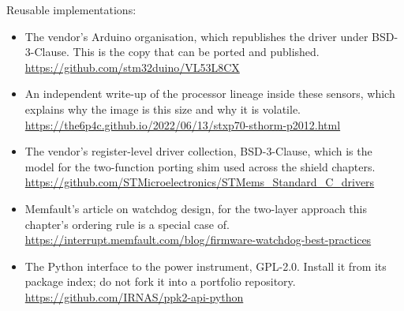 Reusable implementations:
\begin{itemize}
\item The vendor's Arduino organisation, which republishes the driver under
BSD-3-Clause. This is the copy that can be ported and published.\newline
\url{https://github.com/stm32duino/VL53L8CX}
\item An independent write-up of the processor lineage inside these sensors,
which explains why the image is this size and why it is volatile.\newline
\url{https://the6p4c.github.io/2022/06/13/stxp70-sthorm-p2012.html}
\item The vendor's register-level driver collection, BSD-3-Clause, which is the
model for the two-function porting shim used across the shield chapters.\newline
\url{https://github.com/STMicroelectronics/STMems_Standard_C_drivers}
\item Memfault's article on watchdog design, for the two-layer approach this
chapter's ordering rule is a special case of.\newline
\url{https://interrupt.memfault.com/blog/firmware-watchdog-best-practices}
\item The Python interface to the power instrument, GPL-2.0. Install it from its
package index; do not fork it into a portfolio repository.\newline
\url{https://github.com/IRNAS/ppk2-api-python}
\end{itemize}
